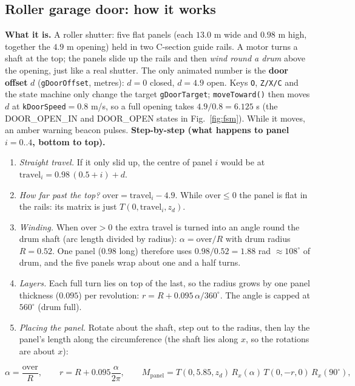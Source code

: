 \documentclass[10pt,a4paper]{article}
\newcommand{\fn}[1]{\texttt{#1}}
\begin{document}
\subsection{Roller garage door: how it works}\label{sec:door}
\textbf{What it is.} A roller shutter: five flat panels (each $13.0$ m wide and $0.98$ m high, together the $4.9$ m opening) held in two C-section guide rails. A motor turns a shaft
at the top; the panels slide up the rails and then \emph{wind round a drum} above the opening, just like a real shutter. The only animated number is the \textbf{door offset} $d$ (\fn{gDoorOffset}, metres):
$d=0$ closed, $d=4.9$ open. Keys \fn{O}, \fn{Z/X/C} and the state machine only change the target \fn{gDoorTarget}; \fn{moveToward()} then moves $d$ at \fn{kDoorSpeed}$=0.8$ m/s, so a full opening takes $4.9/0.8=6.125$ s
(the DOOR\_OPEN\_IN and DOOR\_OPEN states in Fig.~\ref{fig:fsm}). While it moves, an amber warning beacon pulses.
\textbf{Step-by-step (what happens to panel $i=0..4$, bottom to top).}
\begin{enumerate}[leftmargin=*,label=\textbf{\arabic*.}]
\item \emph{Straight travel.} If it only slid up, the centre of panel $i$ would be at $\text{travel}_i=0.98\,(0.5+i)+d$.
\item \emph{How far past the top?} $\text{over}=\text{travel}_i-4.9$. While $\text{over}\le0$ the panel is flat in the rails: its matrix is just $T(0,\text{travel}_i,z_d)$.
\item \emph{Winding.} When $\text{over}>0$ the extra travel is turned into an angle round the drum shaft (arc length divided by radius): $\alpha=\text{over}/R$ with drum radius $R=0.52$.
One panel ($0.98$ long) therefore uses $0.98/0.52=1.88$ rad $\approx108^\circ$ of drum, and the five panels wrap about one and a half turns.
\item \emph{Layers.} Each full turn lies on top of the last, so the radius grows by one panel thickness ($0.095$) per revolution: $r=R+0.095\,\alpha/360^\circ$. The angle is capped at $560^\circ$ (drum full).
\item \emph{Placing the panel.} Rotate about the shaft, step out to the radius, then lay the panel's length along the circumference (the shaft lies along $x$, so the rotations are about $x$):
\end{enumerate}
\begin{equation}\alpha=\frac{\text{over}}{R},\qquad r=R+0.095\frac{\alpha}{2\pi},\qquad M_{\text{panel}}=T(0,5.85,z_d)\,R_x(\alpha)\,T(0,-r,0)\,R_x(90^\circ),\label{eq:door}\end{equation}
\end{document}
